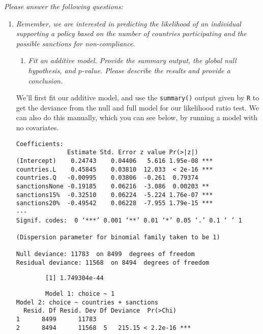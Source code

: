 \documentclass[12pt,letterpaper]{article}
\begin{document}
\newpage
\noindent \textit{Please answer the following questions:}

\begin{enumerate}
	\item
	\textit{Remember, we are interested in predicting the likelihood of an individual supporting a policy based on the number of countries participating and the possible sanctions for non-compliance.}
	\begin{enumerate}
		\item [] \textit{Fit an additive model. Provide the summary output, the global null hypothesis, and $p$-value. Please describe the results and provide a conclusion.}

	\end{enumerate}
	
		We’ll first fit our additive model, and use the \texttt{summary()} output given by \texttt{R} to get the deviance from the null and full model for our likelihood ratio test. We can also do this manually, which you can see below, by running a model with no covariates.
		
	 
	
	\begin{verbatim}
Coefficients:
              Estimate Std. Error z value Pr(>|z|)    
(Intercept)    0.24743    0.04406   5.616 1.95e-08 ***
countries.L    0.45845    0.03810  12.033  < 2e-16 ***
countries.Q   -0.00995    0.03806  -0.261  0.79374    
sanctionsNone -0.19185    0.06216  -3.086  0.00203 ** 
sanctions15%  -0.32510    0.06224  -5.224 1.76e-07 ***
sanctions20%  -0.49542    0.06228  -7.955 1.79e-15 ***
---
Signif. codes:  0 ‘***’ 0.001 ‘**’ 0.01 ‘*’ 0.05 ‘.’ 0.1 ‘ ’ 1

(Dispersion parameter for binomial family taken to be 1)

Null deviance: 11783  on 8499  degrees of freedom
Residual deviance: 11568  on 8494  degrees of freedom\end{verbatim}
	
	 
	
	\begin{verbatim}
		[1] 1.749304e-44
	\end{verbatim}

	 
	
	\begin{verbatim}
		Model 1: choice ~ 1
Model 2: choice ~ countries + sanctions
  Resid. Df Resid. Dev Df Deviance  Pr(>Chi)    
1      8499      11783                          
2      8494      11568  5   215.15 < 2.2e-16 ***
	\end{verbatim}
	

\end{enumerate}
\end{document}
